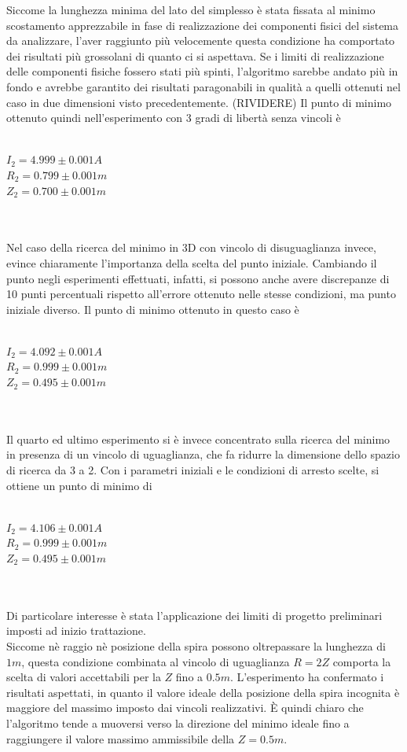 \documentclass[a4paper, 11pt]{article}
\begin{document}
Siccome la lunghezza minima del lato del simplesso è stata fissata al minimo
scostamento apprezzabile in fase di realizzazione dei componenti fisici del
sistema da analizzare, l'aver raggiunto più velocemente questa condizione ha
comportato dei risultati più grossolani di quanto ci si aspettava. Se i limiti
di realizzazione delle componenti fisiche fossero stati più spinti, l'algoritmo
sarebbe andato più in fondo e avrebbe garantito dei risultati paragonabili in
qualità a quelli ottenuti nel caso in due dimensioni visto precedentemente.
(RIVIDERE)
Il
punto di minimo ottenuto quindi nell'esperimento con 3 gradi di libertà senza
vincoli è \\ \\
\centerline{ $I_{2} = 4.999 \pm 0.001 A$ \\ $R_{2} = 0.799 \pm 0.001m$ \\ $Z_{2}
= 0.700 \pm 0.001m$} \\ \\
Nel caso della ricerca del minimo in 3D con vincolo di disuguaglianza invece,
evince chiaramente l'importanza della scelta del punto iniziale. Cambiando il
punto negli esperimenti effettuati, infatti, si possono anche avere discrepanze
di 10 punti percentuali rispetto all'errore ottenuto nelle stesse condizioni, ma
punto iniziale diverso. Il punto di minimo ottenuto in questo caso è \\ \\
\centerline{ $I_{2} = 4.092 \pm 0.001 A$ \\ $R_{2} = 0.999 \pm 0.001m$ \\ $Z_{2}
= 0.495 \pm 0.001m$} \\ \\
Il quarto ed ultimo esperimento si è invece concentrato sulla ricerca del minimo
in presenza di un vincolo di uguaglianza, che fa ridurre la dimensione dello
spazio di ricerca da 3 a 2. Con i parametri iniziali e le condizioni di arresto
scelte, si ottiene un punto di minimo di \\ \\
\centerline{ $I_{2} = 4.106 \pm 0.001 A$ \\ $R_{2} = 0.999 \pm 0.001m$ \\ $Z_{2}
= 0.495 \pm 0.001m$} \\ \\
Di particolare interesse è stata l'applicazione dei limiti di progetto
preliminari imposti ad inizio trattazione. \\ 
Siccome nè raggio nè posizione della spira possono oltrepassare la lunghezza di
$1m$, questa condizione combinata al vincolo di uguaglianza $R = 2Z$ comporta la
scelta di valori accettabili per la $Z$ fino a $0.5m$. L'esperimento ha
confermato i risultati aspettati, in quanto il valore ideale della posizione
della spira incognita è maggiore del massimo imposto dai vincoli realizzativi. È
quindi chiaro che l'algoritmo tende a muoversi verso la direzione del minimo
ideale fino a raggiungere il valore massimo ammissibile della $Z = 0.5m$.


    
\end{document}
